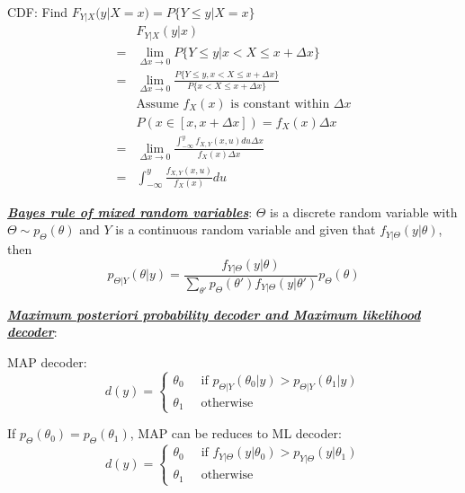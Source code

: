\documentclass[12pt]{article}
\newcommand{\bulletPoint}[1]{\ul{\textit{\textbf{#1}}}}
\begin{document}
\begin{multicols*}{4}
CDF: Find $F_{Y|X}(y | X=x) = P\{ Y\leq y | X=x\}$
\useshortskip \begin{equation*}
    \begin{split}
        & F_{Y|X}(y|x) \\
        = & \lim_{\Delta x \rightarrow 0}P\{ Y \leq y | x < X \leq x+\Delta x \} \\
        = & \lim_{\Delta x \rightarrow 0} \frac{P\{ Y \leq y , x < X \leq x+\Delta x \}}{P\{ x < X \leq x+\Delta x \}}\\
        & \text{Assume $f_X(x)$ is constant within $\Delta x$}\\
        & P(x \in [x, x+\Delta x]) = f_X(x) \Delta x\\
        = & \lim_{\Delta x \rightarrow 0} \frac{\int^y_{- \infty} f_{X,Y}(x,u)du \Delta x}{f_X(x)\Delta x}\\
        = & \int^y_{- \infty} \frac{f_{X,Y}(x,u)}{f_X(x)} du
    \end{split}     
\end{equation*}


\bulletPoint{Bayes rule of mixed random variables}:
$\Theta$ is a discrete random variable with $\Theta \sim p_\Theta (\theta)$ and $Y$ is a continuous random variable and given that $f_{Y|\Theta}(y | \theta)$, then
\useshortskip \begin{equation*}
    p_{\Theta | Y}(\theta|y) = \frac{f_{Y|\Theta}(y|\theta)}{\sum_{\theta '}p_\Theta (\theta ') f_{Y|\Theta}(y|\theta ')} p_\Theta(\theta)
\end{equation*}


\bulletPoint{Maximum posteriori probability decoder and Maximum likelihood decoder}:

MAP decoder:
\useshortskip \begin{equation*}
    d(y) = 
    \begin{cases}
        \theta_0 \; & \; \text{if } p_{\Theta|Y}(\theta_0 | y) > p_{\Theta|Y}(\theta_1 | y) \\
        \theta_1 \; & \; \text{otherwise}
    \end{cases}
\end{equation*}

If $p_\Theta(\theta_0) = p_\Theta(\theta_1)$, MAP can be reduces to ML decoder:
\useshortskip \begin{equation*}
    d(y) = 
    \begin{cases}
        \theta_0 \; & \; \text{if } f_{Y|\Theta}(y | \theta_0) > p_{Y | \Theta}(y | \theta_1) \\
        \theta_1 \; & \; \text{otherwise}
    \end{cases}
\end{equation*}


\end{multicols*}
\end{document}
